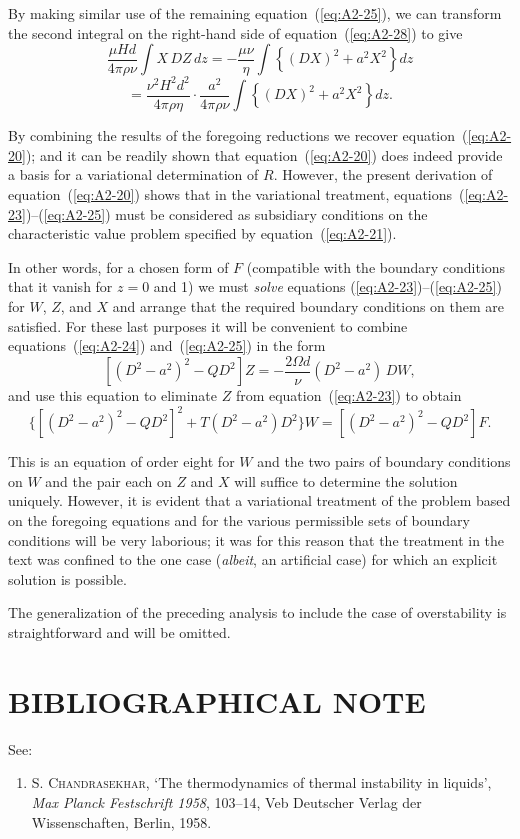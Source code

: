 By making similar use of the remaining equation~(\ref{eq:A2-25}), we can transform the second integral on the right-hand side of equation~(\ref{eq:A2-28}) to give
\begin{equation}
\label{eq:A2-29}
\frac{\mu Hd}{4\pi\rho\nu} \int X\, DZ \, dz = -\frac{\mu\nu}{\eta} \int \left\{ (DX)^2 + a^2 X^2 \right\} dz
\end{equation}
\[
= \frac{\nu^2 H^2 d^2}{4\pi\rho\eta} \cdot \frac{a^2}{4\pi\rho\nu} \int \left\{ (DX)^2 + a^2 X^2 \right\} dz.
\]

By combining the results of the foregoing reductions we recover equation~(\ref{eq:A2-20}); and it can be readily shown that equation~(\ref{eq:A2-20}) does indeed provide a basis for a variational determination of $R$. However, the present derivation of equation~(\ref{eq:A2-20}) shows that in the variational treatment, equations~(\ref{eq:A2-23})--(\ref{eq:A2-25}) must be considered as subsidiary conditions on the characteristic value problem specified by equation~(\ref{eq:A2-21}).

In other words, for a chosen form of $F$ (compatible with the boundary conditions that it vanish for $z = 0$ and 1) we must \emph{solve} equations (\ref{eq:A2-23})--(\ref{eq:A2-25}) for $W$, $Z$, and $X$ and arrange that the required boundary conditions on them are satisfied. For these last purposes it will be convenient to combine equations~(\ref{eq:A2-24}) and~(\ref{eq:A2-25}) in the form
\begin{equation}
\label{eq:A2-30}
[(D^2 - a^2)^2 - QD^2]Z = -\frac{2\Omega d}{\nu}(D^2 - a^2)\,DW,
\end{equation}
and use this equation to eliminate $Z$ from equation~(\ref{eq:A2-23}) to obtain
\begin{equation}
\label{eq:A2-31}
\{[(D^2 - a^2)^2 - QD^2]^2 + T(D^2 - a^2)D^2\}W = [(D^2 - a^2)^2 - QD^2]F.
\end{equation}

This is an equation of order eight for $W$ and the two pairs of boundary conditions on $W$ and the pair each on $Z$ and $X$ will suffice to determine the solution uniquely. However, it is evident that a variational treatment of the problem based on the foregoing equations and for the various permissible sets of boundary conditions will be very laborious; it was for this reason that the treatment in the text was confined to the one case (\emph{albeit}, an artificial case) for which an explicit solution is possible.

The generalization of the preceding analysis to include the case of overstability is straightforward and will be omitted.

\section*{BIBLIOGRAPHICAL NOTE}

See:
\begin{enumerate}
\item S. \textsc{Chandrasekhar}, `The thermodynamics of thermal instability in liquids', \textit{Max Planck Festschrift 1958}, 103--14, Veb Deutscher Verlag der Wissenschaften, Berlin, 1958.
\end{enumerate}
